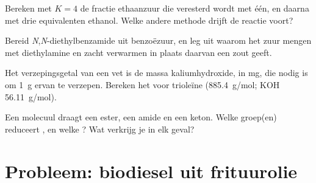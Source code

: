\begin{exercise}[$\star\star$]\label{exo:b2:acyl-substitution:9}
Bereken met $K = 4$ de fractie ethaanzuur die veresterd wordt met één, en daarna met drie
equivalenten ethanol. Welke andere methode drijft de reactie voort?
\end{exercise}

\begin{exercise}[$\star\star\star$]\label{exo:b2:acyl-substitution:10}
Bereid \textit{N},\textit{N}-diethylbenzamide uit benzoëzuur, en leg uit waarom het zuur mengen
met diethylamine en zacht verwarmen in plaats daarvan een zout geeft.
\end{exercise}

\begin{exercise}[$\star\star\star$]\label{exo:b2:acyl-substitution:11}
Het verzepingsgetal van een vet is de massa kaliumhydroxide, in mg, die nodig is om
\qty{1}{g} ervan te verzepen. Bereken het voor trioleïne (\qty{885.4}{g/mol}; KOH \qty{56.11}{g/mol}).
\end{exercise}

\begin{exercise}[$\star\star\star$]\label{exo:b2:acyl-substitution:12}
Een molecuul draagt een ester, een amide en een keton. Welke groep(en) reduceert , en welke
? Wat verkrijg je in elk geval?
\end{exercise}

\section{Probleem: biodiesel uit frituurolie}

